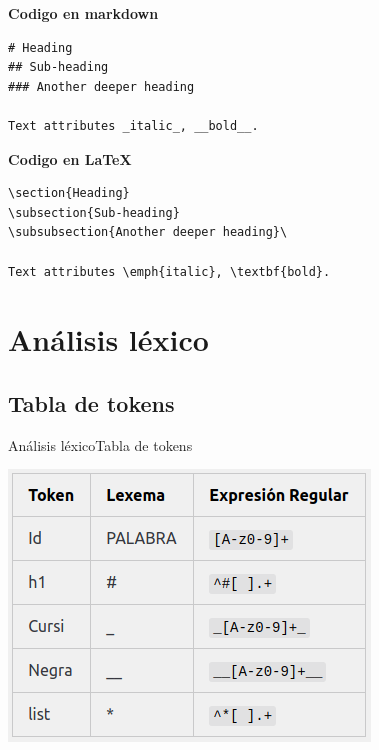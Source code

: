 \documentclass[11pt]{beamer}
\begin{document}
\begin{frame}[fragile]

\textbf{Codigo en markdown}


\begin{verbatim}
# Heading
## Sub-heading
### Another deeper heading
 
Text attributes _italic_, __bold__.

\end{verbatim}


\vspace{1cm}
\textbf{Codigo en \LaTeX}


\begin{verbatim}
\section{Heading}
\subsection{Sub-heading}
\subsubsection{Another deeper heading}\

Text attributes \emph{italic}, \textbf{bold}.

\end{verbatim}

\end{frame}

\section{Análisis léxico}

\subsection{Tabla de tokens}

\begin{frame}{Análisis léxico}{Tabla de tokens}

\begin{center}
\includegraphics[scale=0.7]{imagenes/lex.png} 
\end{center}
\end{frame}
\end{document}

